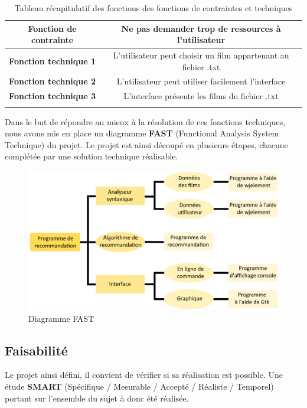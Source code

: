 \documentclass{article}
\begin{document}
\begin{longtable}[c]{|c|c|}
\hline
\textbf{Fonction de contrainte} & Ne pas demander trop de ressources à l'utilisateur             \\ \hline
\endfirsthead

\endhead

\textbf{Fonction technique 1}   & L'utilisateur peut choisir un film appartenant au fichier .txt \\ \hline
\textbf{Fonction technique 2}   & L'utilisateur peut utiliser facilement l'interface             \\ \hline
\textbf{Fonction technique 3}   & L'interface présente les films du fichier .txt                 \\ \hline
\caption{Tableau récapitulatif des fonctions des fonctions de contraintes et techniques}
\label{tab1}\\
\end{longtable}

Dans le but de répondre au mieux à la résolution de ces fonctions techniques, nous avons mis en place un diagramme \textbf{FAST} (Functional Analysis System Technique) du projet. Le projet est ainsi découpé en plusieurs étapes, chacune complétée par une solution technique réalisable.


\begin{figure}[H]
    \centering
    \includegraphics[scale=0.4]{GDP/fast.png}
    \caption{\label{fast} Diagramme FAST}
\end{figure}


\subsection{Faisabilité}

Le projet ainsi défini, il convient de vérifier si sa réalisation est possible. Une étude \textbf{SMART} (Spécifique / Mesurable / Accepté / Réaliste / Temporel) portant sur l'ensemble du sujet à donc été réalisée.
\end{document}
